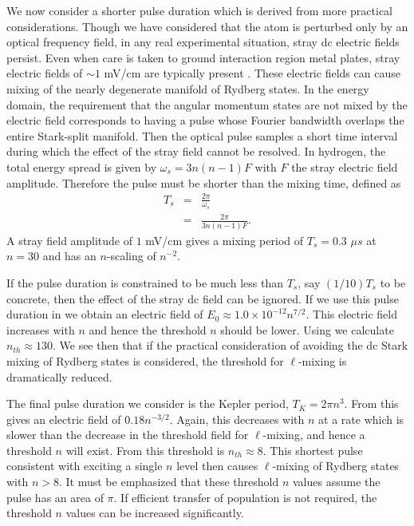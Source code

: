 We now consider a shorter pulse duration which is derived from more practical
considerations.  Though we have considered that the atom is perturbed
only by an optical frequency field, in any real experimental situation, stray dc
electric fields persist. Even when care is taken to ground interaction region
metal plates, stray electric fields of $\sim 1$ mV/cm are typically present
\cite{Frey:93}.  These electric fields can cause mixing of the nearly degenerate
manifold of Rydberg states.  In the energy domain, the requirement that the
angular momentum states are not mixed by the electric field corresponds to
having a pulse whose Fourier bandwidth overlaps the entire Stark-split manifold.
Then the optical pulse samples a short time interval during which the effect of
the stray field cannot be resolved.  In hydrogen, the total energy spread is
given by $\omega_s = 3 n (n-1) F$ with $F$ the stray electric field
amplitude.  Therefore the pulse must be shorter than the mixing time, defined as
\begin{eqnarray}
T_s & = & \frac{2 \pi}{\omega_s} \\
    & = & \frac{2 \pi}{3 n (n-1) F}. \label{Ts}
\end{eqnarray}
A stray field amplitude of $1$ mV/cm gives a mixing period of
$T_s = 0.3$ $\mu s$ at $n = 30$ and has an $n$-scaling of $n^{-2}$.

If the pulse duration is constrained to be much less than $T_s$, say $(1/10)
T_s$ to be concrete, then the effect of the stray dc field can be ignored.
If we use this pulse duration in  we obtain an electric field of
$E_0 \approx 1.0 \times 10^{-12} n^{7/2}$.  This electric field increases with
$n$ and hence the threshold $n$ should be lower.  Using  we calculate
$n_{th} \approx 130$.  We see then that if the practical consideration of
avoiding the dc Stark mixing of Rydberg states is considered, the threshold for
$\ell$-mixing is dramatically reduced.

The final pulse duration we consider is the Kepler period, $T_K = 2\pi n^3$. 
From  this gives an electric field of $0.18 n^{-3/2}$.  Again, this
decreases with $n$ at a rate which is slower than the decrease in the threshold
field for $\ell$-mixing, and hence a threshold $n$ will exist.  From 
this threshold is $n_{th} \approx 8$.  This shortest pulse consistent with
exciting a single $n$ level then causes $\ell$-mixing of Rydberg states with $n
> 8$.  It must be emphasized that these threshold $n$ values assume the pulse
has an area of $\pi$.  If efficient transfer of population is not required, the
threshold $n$ values can be increased significantly.

